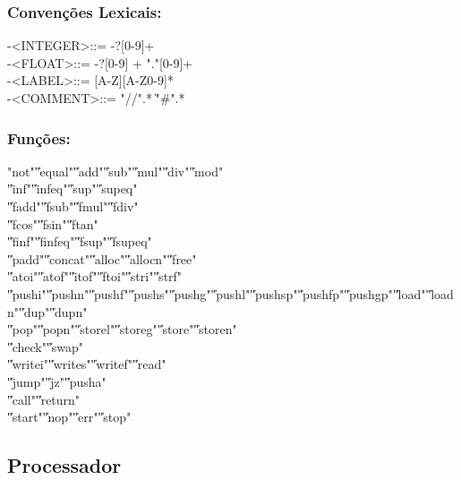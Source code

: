\documentclass{report}
\begin{document}
\subsubsection{Convenções Lexicais:}

 -\quad \textless INTEGER\textgreater \quad ::= -?[0-9]+\\
 -\quad \textless FLOAT\textgreater   \quad ::= -?[0-9] + "."[0-9]+\\
 -\quad \textless LABEL\textgreater   \quad ::= [A-Z][A-Z0-9]* \\
 -\quad \textless COMMENT\textgreater \quad ::= "//".* \quad \| \quad "\#".*\\

\subsubsection{Funções:}

"not"\|"equal"\|"add"\|"sub"\|"mul"\|"div"\|"mod"\|\\
\|"inf"\|"infeq"\|"sup"\|"supeq"\|\\
\|"fadd"\|"fsub"\|"fmul"\|"fdiv"\|\\
\|"fcos"\|"fsin"\|"ftan"\|\\
\|"finf"\|"finfeq"\|"fsup"\|"fsupeq"\|\\
\|"padd"\|"concat"\|"alloc"\|"allocn"\|"free"\|\\
\|"atoi"\|"atof"\|"itof"\|"ftoi"\|"stri"\|"strf"\|\\
\|"pushi"\|"pushn"\|"pushf"\|"pushs"\|"pushg"\|"pushl"\|"pushsp"\|"pushfp"\|"pushgp"\|"load"\|"loadn"\|"dup"\|"dupn"\|\\
\|"pop"\|"popn"\|"storel"\|"storeg"\|"store"\|"storen"\|\\
\|"check"\|"swap"\|\\
\|"writei"\|"writes"\|"writef"\|"read"\|\\
\|"jump"\|"jz"\|"pusha"\|\\
\|"call"\|"return"\|\\
\|"start"\|"nop"\|"err"\|"stop"\\


\subsection{Processador}
\end{document}
